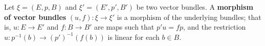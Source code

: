 Let $\xi = (E,p,B)$ and $\xi' = (E',p',B')$ be two vector bundles. A \textbf{morphism of vector bundles} $(u,f): \xi \to \xi'$ is a morphism of the underlying bundles; that is, $u: E \to E'$ and $f: B \to B'$ are maps such that $p'u = fp$, and the restriction $u: p^{-1}(b) \to (p')^{-1}(f(b))$ is linear for each $b \in B$.
